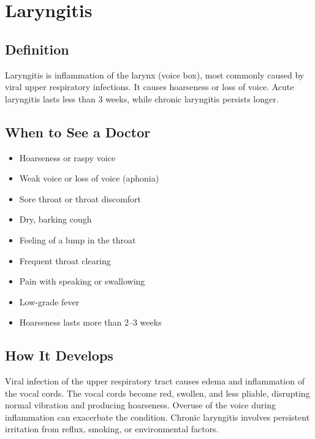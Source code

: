 \chapter{Laryngitis}

\section*{Definition}
Laryngitis is inflammation of the larynx (voice box), most commonly caused by viral upper respiratory infections. It causes hoarseness or loss of voice. Acute laryngitis lasts less than 3 weeks, while chronic laryngitis persists longer.

\section*{When to See a Doctor}
\begin{itemize}
\item Hoarseness or raspy voice
\item Weak voice or loss of voice (aphonia)
\item Sore throat or throat discomfort
\item Dry, barking cough
\item Feeling of a lump in the throat
\item Frequent throat clearing
\item Pain with speaking or swallowing
\item Low-grade fever
  \item Hoarseness lasts more than 2--3 weeks
\end{itemize}

\section*{How It Develops}
Viral infection of the upper respiratory tract causes edema and inflammation of the vocal cords. The vocal cords become red, swollen, and less pliable, disrupting normal vibration and producing hoarseness. Overuse of the voice during inflammation can exacerbate the condition. Chronic laryngitis involves persistent irritation from reflux, smoking, or environmental factors.

